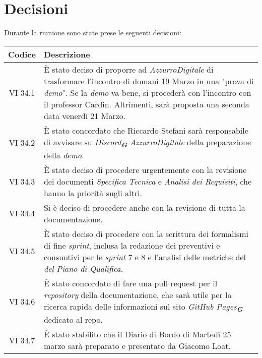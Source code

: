 
\section{Decisioni}

Durante la riunione sono state prese le seguenti decisioni:

\vspace{0.5cm}

\begin{table}[htbp]
    \centering
    \begin{tabular}{|c|p{}|}
        \hline
        \rowcolor[gray]{0.75}
        \textbf{Codice} & \textbf{Descrizione}\\
        \hline
        VI 34.1 & È stato deciso di proporre ad \emph{AzzurroDigitale} di trasformare l'incontro di domani 19 Marzo in una "prova di \emph{demo}". Se la \emph{demo} va bene, si procederà con l'incontro con il professor Cardin. Altrimenti, sarà proposta una seconda data venerdì 21 Marzo.\\
        \hline
        VI 34.2 & È stato concordato che Riccardo Stefani sarà responsabile di avvisare su \emph{Discord}\textsubscript{\textit{\textbf{G}}} \emph{AzzurroDigitale} della preparazione della \emph{demo}.\\
        \hline
        VI 34.3 & È stato deciso di procedere urgentemente con la revisione dei documenti \emph{Specifica Tecnica} e \emph{Analisi dei Requisiti}, che hanno la priorità sugli altri.\\
        \hline 
        VI 34.4 & Si è deciso di procedere anche con la revisione di tutta la documentazione.\\
        \hline
        VI 34.5 & È stato deciso di procedere con la scrittura dei formalismi di fine \emph{sprint}, inclusa la redazione dei preventivi e consuntivi per le \emph{sprint} 7 e 8 e l'analisi delle metriche del \emph{del \emph{Piano di Qualifica}}.\\
        \hline
        VI 34.6 & È stato concordato di fare una pull request per il \emph{repository} della documentazione, che sarà utile per la ricerca rapida delle informazioni sul sito \emph{GitHub Pages}\textsubscript{\textit{\textbf{G}}} dedicato al repo.\\
        \hline
        VI 34.7 & È stato stabilito che il Diario di Bordo di Martedì 25 marzo sarà preparato e presentato da Giacomo Loat.\\

\end{tabular}
\end{table}

